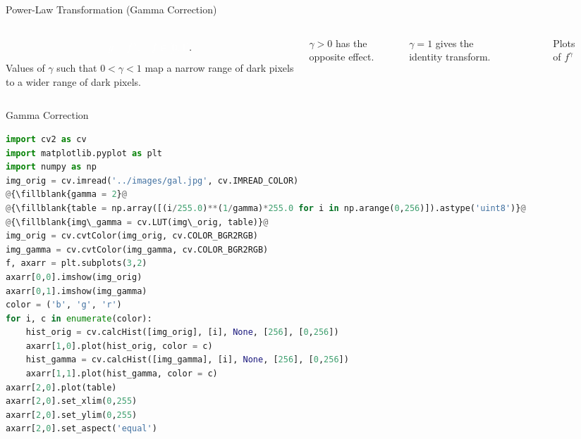 \begin{frame}{Power-Law Transformation (Gamma Correction)}
    \begin{columns}[t]
        \begin{equation*}
            \fillblank{g = f^\gamma, \quad f \in [0,1]}.
        \end{equation*}
        Values of $\gamma$ such that $0 < \gamma < 1$ map a narrow range of dark pixels to a wider range of dark pixels.\par
        $\gamma > 0$ has the opposite effect.\par
        $\gamma = 1$ gives the identity transform.
        {
        \begin{figure}
            \centering
            
            \caption{Plots of $f^\gamma$}
        \end{figure}
        }
    \end{columns}
\end{frame}



\begin{frame}{Gamma Correction}
    \begin{lstlisting}[caption=Gamma Correction, language=Python, escapechar=\@]
%matplotlib inline
import cv2 as cv
import matplotlib.pyplot as plt
import numpy as np
img_orig = cv.imread('../images/gal.jpg', cv.IMREAD_COLOR)
@{\fillblank{gamma = 2}@
@{\fillblank{table = np.array([(i/255.0)**(1/gamma)*255.0 for i in np.arange(0,256)]).astype('uint8')}@
@{\fillblank{img\_gamma = cv.LUT(img\_orig, table)}@
img_orig = cv.cvtColor(img_orig, cv.COLOR_BGR2RGB)
img_gamma = cv.cvtColor(img_gamma, cv.COLOR_BGR2RGB)
f, axarr = plt.subplots(3,2)
axarr[0,0].imshow(img_orig)
axarr[0,1].imshow(img_gamma)
color = ('b', 'g', 'r')
for i, c in enumerate(color):
    hist_orig = cv.calcHist([img_orig], [i], None, [256], [0,256])
    axarr[1,0].plot(hist_orig, color = c)
    hist_gamma = cv.calcHist([img_gamma], [i], None, [256], [0,256])
    axarr[1,1].plot(hist_gamma, color = c)
axarr[2,0].plot(table)
axarr[2,0].set_xlim(0,255)
axarr[2,0].set_ylim(0,255)
axarr[2,0].set_aspect('equal')
    \end{lstlisting}

\end{frame}



